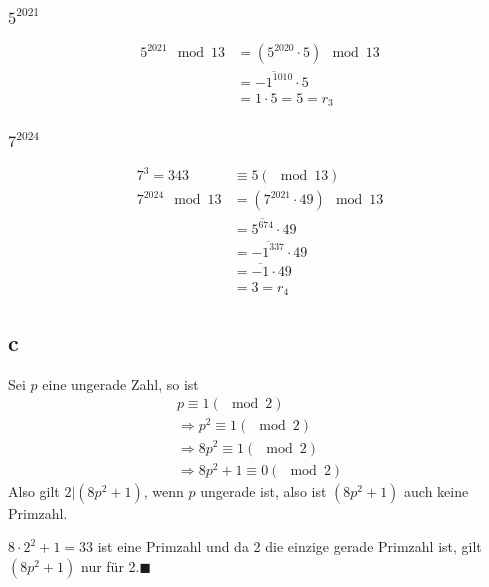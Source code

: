 \documentclass{article}
\begin{document}
\subsubsection*{$5^{2021}$}
\begin{align*}
    5^{2021}\mod 13 &=(5^{2020}\cdot 5)\mod 13\\
    &=\overline{-1^{1010}}\cdot 5\\
    &=1\cdot 5=5=r_3
\end{align*}
\subsubsection*{$7^{2024}$}
\begin{align*}
    7^3=343&\equiv 5(\mod 13)\\
    7^{2024}\mod 13&=(7^{2021}\cdot 49)\mod 13\\
    &=\overline{5^{674}}\cdot 49\\
    &=\overline{-1^{337}}\cdot 49\\
    &=\overline{-1}\cdot 49\\
    &=3=r_4
\end{align*}
\subsection*{c}
Sei $p$ eine ungerade Zahl, so ist
\begin{align*}
    p\equiv 1(\mod 2)\\
    \Rightarrow p^2\equiv 1(\mod 2)\\
    \Rightarrow 8p^2\equiv 1(\mod 2)\\
    \Rightarrow 8p^2+1\equiv 0(\mod 2)
\end{align*}
Also gilt $2|(8p^2+1)$, wenn $p$ ungerade ist, also ist
$(8p^2+1)$ auch keine Primzahl.

$8\cdot 2^2+1 = 33$ ist eine Primzahl und da 2
die einzige gerade Primzahl ist, gilt $(8p^2+1)$
nur für 2.$\blacksquare$
\end{document}
